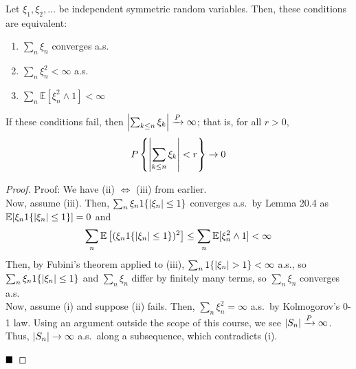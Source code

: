 \begin{theorem}
    Let $\xi_1, \xi_2, \ldots$ be independent symmetric random variables. Then, these conditions are equivalent:
    \begin{enumerate}[label = (\roman*)]
        \item $\sum_n \xi_n$ converges a.s.
        \item $\sum_n \xi_n^2 < \infty$ a.s.
        \item $\sum_n \mathbb{E}[\xi_n^2 \wedge 1] < \infty$
    \end{enumerate}
    If these conditions fail, then $\left\lvert {\sum_{k \leq n} \xi_k} \right\rvert \xrightarrow{P} \infty$; that is, for all $r > 0$,
    \[ P\left\{\left\lvert {\sum_{k \leq n} \xi_k} \right\rvert < r\right\} \to 0 \]
\end{theorem}
\begin{proof}{Proof:}
    We have (ii) $\iff$ (iii) from earlier.\\

    
  
    Now, assume (iii). Then, $\sum_n \xi_n1\{\left\lvert {\xi_n} \right\rvert \leq 1\}$ converges a.s.\ by Lemma 20.4 as $\mathbb{E}[\xi_n1\{\left\lvert {\xi_n} \right\rvert \leq 1\}] = 0$ and
    \[ \sum_n \mathbb{E}\left[(\xi_n1\{\left\lvert {\xi_n} \right\rvert \leq 1\})^2\right] \leq \sum_n \mathbb{E}[\xi_n^2 \wedge 1] < \infty \]
    Then, by Fubini's theorem applied to (iii), $\sum_n 1\{\left\lvert {\xi_n} \right\rvert > 1\} < \infty$ a.s., so $\sum_n \xi_n1\{\left\lvert {\xi_n} \right\rvert \leq 1\}$ and $\sum_n \xi_n$ differ by finitely many terms, so $\sum_n \xi_n$ converges a.s.\\

    Now, assume (i) and suppose (ii) fails. Then, $\sum_n \xi_n^2 = \infty$ a.s.\ by Kolmogorov's 0-1 law. Using an argument outside the scope of this course, we see $\left\lvert {S_n} \right\rvert \xrightarrow{P} \infty$. Thus, $\left\lvert {S_n} \right\rvert \to \infty$ a.s.\ along a subsequence, which contradicts (i).

    $\qed$
\end{proof}
